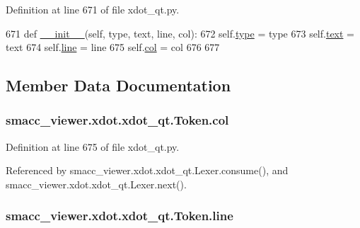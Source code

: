 Definition at line 671 of file xdot\+\_\+qt.\+py.


\begin{DoxyCode}
671     \textcolor{keyword}{def }\hyperlink{classsmacc__viewer_1_1xdot_1_1xdot__qt_1_1Token_a14e5962ec2e13a77788b88fc0e75ac3f}{\_\_init\_\_}(self, type, text, line, col):
672         self.\hyperlink{classsmacc__viewer_1_1xdot_1_1xdot__qt_1_1Token_a7fe2400bff8e8afe706b99cd08ed54d2}{type} = type
673         self.\hyperlink{classsmacc__viewer_1_1xdot_1_1xdot__qt_1_1Token_ab91dfc81bcb5ccee85aa2afbdd2458e5}{text} = text
674         self.\hyperlink{classsmacc__viewer_1_1xdot_1_1xdot__qt_1_1Token_a8f80d30cf3992d660761d410f26aacf7}{line} = line
675         self.\hyperlink{classsmacc__viewer_1_1xdot_1_1xdot__qt_1_1Token_a43b911836db7ac4fc9743c063ffc3c22}{col} = col
676 
677 
\end{DoxyCode}


\subsection{Member Data Documentation}
\subsubsection[{\texorpdfstring{col}{col}}]{\setlength{\rightskip}{0pt plus 5cm}smacc\+\_\+viewer.\+xdot.\+xdot\+\_\+qt.\+Token.\+col}\hypertarget{classsmacc__viewer_1_1xdot_1_1xdot__qt_1_1Token_a43b911836db7ac4fc9743c063ffc3c22}{}\label{classsmacc__viewer_1_1xdot_1_1xdot__qt_1_1Token_a43b911836db7ac4fc9743c063ffc3c22}


Definition at line 675 of file xdot\+\_\+qt.\+py.



Referenced by smacc\+\_\+viewer.\+xdot.\+xdot\+\_\+qt.\+Lexer.\+consume(), and smacc\+\_\+viewer.\+xdot.\+xdot\+\_\+qt.\+Lexer.\+next().

\subsubsection[{\texorpdfstring{line}{line}}]{\setlength{\rightskip}{0pt plus 5cm}smacc\+\_\+viewer.\+xdot.\+xdot\+\_\+qt.\+Token.\+line}\hypertarget{classsmacc__viewer_1_1xdot_1_1xdot__qt_1_1Token_a8f80d30cf3992d660761d410f26aacf7}{}\label{classsmacc__viewer_1_1xdot_1_1xdot__qt_1_1Token_a8f80d30cf3992d660761d410f26aacf7}


